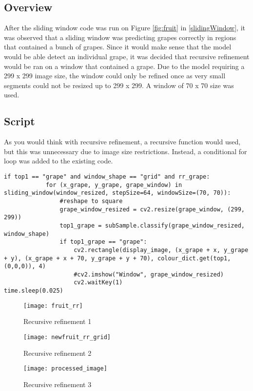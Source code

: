 \subsection*{Overview}
After the sliding window code was run on Figure \ref{fig:fruit} in \ref{slidingWindow},
it was observed that a sliding window was predicting grapes correctly in
regions that contained a bunch of grapes. Since it would make sense that the
model would be able detect an individual grape, it was decided that
recursive refinement would be ran on a window that contained a grape. Due to the model
requiring a 299 x 299 image size, the window could only be refined once as
very small segments could not be resized up to 299 x 299. A window of 70 x 70 size was used.

\subsection*{Script}
As you would think with recursive refinement, a recursive function would used,
but this was unnecessary due to image size restrictions. Instead, a
conditional for loop was added to the existing code.
\begin{lstlisting}
if top1 == "grape" and window_shape == "grid" and rr_grape:
			for (x_grape, y_grape, grape_window) in sliding_window(window_resized, stepSize=64, windowSize=(70, 70)):
				#reshape to square
				grape_window_resized = cv2.resize(grape_window, (299, 299))
				top1_grape = subSample.classify(grape_window_resized, window_shape)
				if top1_grape == "grape":
					cv2.rectangle(display_image, (x_grape + x, y_grape + y), (x_grape + x + 70, y_grape + y + 70), colour_dict.get(top1, (0,0,0)), 4)
					#cv2.imshow("Window", grape_window_resized)
					cv2.waitKey(1)
time.sleep(0.025)
\end{lstlisting}

\begin{figure}
    \texttt{[image: fruit\_rr]}
      \caption{Recursive refinement 1}
      \label{fig:rr1}
\end{figure}

\begin{figure}
    \texttt{[image: newfruit\_rr\_grid]}
      \caption{Recursive refinement 2}
      \label{fig:rr2}
\end{figure}

\begin{figure}
    \texttt{[image: processed\_image]}
      \caption{Recursive refinement 3}
      \label{fig:rr3}
\end{figure}


